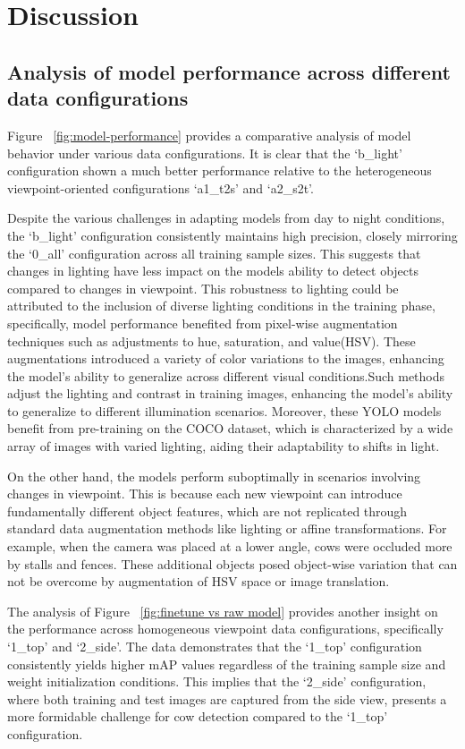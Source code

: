 \section{Discussion}
\subsection{Analysis of model performance across different data configurations}

Figure ~\ref{fig:model-performance} provides a comparative analysis of model behavior under various data configurations. It is clear that the `b\_light' configuration shown a much better performance relative to the heterogeneous viewpoint-oriented configurations `a1\_t2s' and `a2\_s2t'.

Despite the various challenges in adapting models from day to night conditions, the `b\_light' configuration consistently maintains high precision, closely mirroring the `0\_all' configuration across all training sample sizes. This suggests that changes in lighting have less impact on the models ability to detect objects compared to changes in viewpoint. This robustness to lighting could be attributed to the inclusion of diverse lighting conditions in the training phase, specifically, model performance benefited from pixel-wise augmentation techniques such as adjustments to hue, saturation, and value(HSV). These augmentations introduced a variety of color variations to the images, enhancing the model's ability to generalize across different visual conditions.Such methods adjust the lighting and contrast in training images, enhancing the model's ability to generalize to different illumination scenarios. Moreover, these YOLO models benefit from pre-training on the COCO dataset, which is characterized by a wide array of images with varied lighting, aiding their adaptability to shifts in light.

On the other hand, the models perform suboptimally in scenarios involving changes in viewpoint. This is because each new viewpoint can introduce fundamentally different object features, which are not replicated through standard data augmentation methods like lighting or affine transformations. For example, when the camera was placed at a lower angle, cows were occluded more by stalls and fences. These additional objects posed object-wise variation that can not be overcome by augmentation of HSV space or image translation.

The analysis of Figure ~\ref{fig:finetune vs raw model} provides another insight on the performance across homogeneous viewpoint data configurations, specifically `1\_top' and `2\_side'. The data demonstrates that the `1\_top' configuration consistently yields higher mAP values regardless of the training sample size and weight initialization conditions. This implies that the `2\_side' configuration, where both training and test images are captured from the side view, presents a more formidable challenge for cow detection compared to the `1\_top' configuration.

